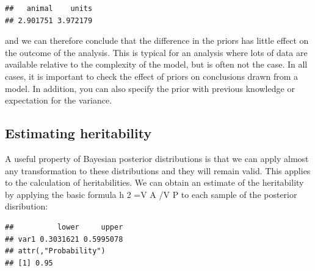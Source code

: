 \documentclass[
  12pt,
]{book}
\newenvironment{Shaded}{\begin{snugshade}}{\end{snugshade}}
\newcommand{\FloatTok}[1]{\textcolor[rgb]{0.00,0.00,0.81}{#1}}
\newcommand{\FunctionTok}[1]{\textcolor[rgb]{0.00,0.00,0.00}{#1}}
\newcommand{\NormalTok}[1]{#1}
\newcommand{\OtherTok}[1]{\textcolor[rgb]{0.56,0.35,0.01}{#1}}
\newcommand{\SpecialCharTok}[1]{\textcolor[rgb]{0.00,0.00,0.00}{#1}}
\newcommand{\StringTok}[1]{\textcolor[rgb]{0.31,0.60,0.02}{#1}}
\begin{document}
\begin{Shaded}
\end{Shaded}

\begin{verbatim}
##   animal    units 
## 2.901751 3.972179
\end{verbatim}

and we can therefore conclude that the difference in the priors has little effect on the outcome of the analysis. This is typical for an analysis where lots of data are available relative to the complexity of the model, but is often not the case. In all cases, it is important to check the effect of priors on conclusions drawn from a model. In addition, you can also specify the prior with previous knowledge or expectation for the variance.

\hypertarget{estimating-heritability-1}{%
\subsection{Estimating heritability}\label{estimating-heritability-1}}

A useful property of Bayesian posterior distributions is that we can apply almost any transformation to these distributions and they will remain valid. This applies to the calculation of heritabilities. We can obtain an estimate of the heritability by applying the basic formula h 2 =V A /V P to each sample of the posterior disribution:

\begin{Shaded}
\end{Shaded}

\begin{verbatim}
##          lower     upper
## var1 0.3031621 0.5995078
## attr(,"Probability")
## [1] 0.95
\end{verbatim}
\end{document}
